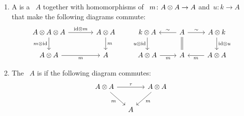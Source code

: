 \documentclass[a4paper,10pt,headings=standardclasses]{scrartcl}
\begin{document}
\begin{definition}
  \leavevmode
  \begin{enumerate}
    \item
      A  is a {\dgv}~$A$ together with homomorphisms of {\dgvs}~$m \colon A \otimes A \to A$ and~$u \colon k \to A$ that make the following diagrams commute:
      \[
        \begin{tikzcd}[column sep = large]
          A \tensor A \tensor A
          \arrow{r}[above]{{\id} \tensor m}
          \arrow{d}[left]{m \tensor {\id}}
          &
          A \tensor A
          \arrow{d}[right]{m}
          \\
          A \tensor A
          \arrow{r}[below]{m}
          &
          A
        \end{tikzcd}
        \qquad
        \begin{tikzcd}
          k \tensor A
          \arrow{d}[left]{u \tensor {\id}}
          &
          A
          \arrow{l}[above]{\sim}
          \arrow[equal]{d}
          \arrow{r}[above]{\sim}
          &
          A \tensor k
          \arrow{d}[right]{{\id} \tensor u}
          \\
          A \tensor A
          \arrow{r}[below]{m}
          &
          A
          &
          A \tensor A
          \arrow{l}[below]{m}
        \end{tikzcd}
      \]
    \item
      The {\dga}~$A$ is  if the following diagram commutes:
      \[
        \begin{tikzcd}[column sep = small]
          A \tensor A
          \arrow{rr}[above]{\tau}
          \arrow{dr}[below left]{m}
          &
          {}
          &
          A \tensor A
          \arrow{dl}[below right]{m}
          \\
          {}
          &
          A
          &
          {}
        \end{tikzcd}
      \]

\end{enumerate}
\end{definition}
\end{document}
